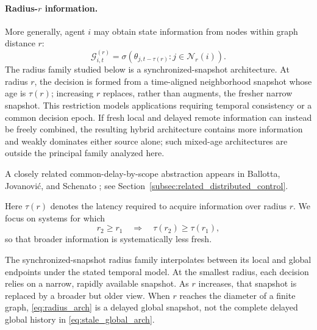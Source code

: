 \documentclass[11pt]{article}
\begin{document}
\paragraph{Radius-$r$ information.}
More generally, agent $i$ may obtain state information from nodes within graph
distance $r$:
\begin{equation}
    \mathcal{G}_{i,t}^{(r)}
    =
    \sigma\!\left(
        \theta_{j,t-\tau(r)}:
        j\in\mathcal{N}_r(i)
    \right).
    \label{eq:radius_arch}
\end{equation}
The radius family studied below is a synchronized-snapshot architecture. At
radius $r$, the decision is formed from a time-aligned neighborhood snapshot
whose age is $\tau(r)$; increasing $r$ replaces, rather than augments, the
fresher narrow snapshot. This restriction models applications requiring temporal
consistency or a common decision epoch. If fresh local and delayed remote
information can instead be freely combined, the resulting hybrid architecture
contains more information and weakly dominates either source alone; such
mixed-age architectures are outside the principal family analyzed here.

A closely related common-delay-by-scope abstraction appears in
Ballotta, Jovanovi\'c, and Schenato \cite{ballotta2023latency}; see
Section~\ref{subsec:related_distributed_control}.

Here $\tau(r)$ denotes the latency required to acquire information over
radius $r$. We focus on systems for which
\begin{equation}
    r_2\ge r_1
    \quad\Longrightarrow\quad
    \tau(r_2)\ge\tau(r_1),
    \label{eq:scope_latency}
\end{equation}
so that broader information is systematically less fresh.

The synchronized-snapshot radius family interpolates between its local and
global endpoints under the stated temporal model. At the smallest radius, each
decision relies on a narrow, rapidly available snapshot. As $r$ increases,
that snapshot is replaced by a broader but older view. When $r$ reaches the
diameter of a finite graph, \eqref{eq:radius_arch} is a delayed global snapshot,
not the complete delayed global history in \eqref{eq:stale_global_arch}.
\end{document}
